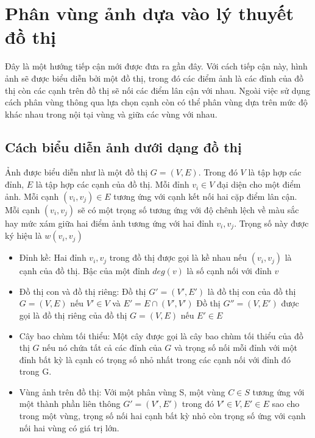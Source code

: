 \documentclass[12pt,oneside,a4]{report}
\begin{document}
\section{Phân vùng ảnh dựa vào lý thuyết đồ thị}
Đây là một hướng tiếp cận mới được đưa ra gần đây. Với cách tiếp cận này, hình ảnh sẽ được biểu diễn bởi một đồ thị, trong đó các điểm ảnh là các đỉnh của đồ thị còn các cạnh trên đồ thị sẽ nối các điểm lân cận với nhau. Ngoài việc sử dụng cách phân vùng thông qua lựa chọn cạnh còn có thể phân vùng dựa trên mức độ khác nhau trong nội tại vùng và giữa các vùng với nhau.
\subsection{Cách biểu diễn ảnh dưới dạng đồ thị}
Ảnh được biểu diễn như là một đồ thị $G=(V,E)$. Trong đó $V$ là tập hợp các đỉnh, $E$ là tập hợp các cạnh của đồ thị. Mỗi đỉnh $v_i\in V$ đại diện cho một điểm ảnh. Mỗi cạnh $(v_i,v_j)\in E$ tương ứng với cạnh kết nối hai cặp điểm lân cận. Mỗi cạnh $(v_i,v_j)$ sẽ có một trọng số tương ứng với độ chênh lệch về màu sắc hay mức xám giữa hai điểm ảnh tương ứng với hai đỉnh $v_i, v_j $. Trọng số này được ký hiệu là $w(v_i, v_j)$
\begin{itemize}
\item Đỉnh kề: Hai đỉnh $v_i, v_j$ trong đồ thị được gọi là kề nhau nếu $(v_i,v_j)$ là cạnh của đồ thị. Bậc của một đỉnh $deg(v)$ là số cạnh nối với đỉnh $v$
\item Đồ thị con và đồ thị riêng:
Đồ thị $G'=(V',E')$ là đồ thị con của đồ thị $G=(V,E)$ nếu $V'\in V$ và $E'=E\cap (V',V')$ 
Đồ thị  $G''=(V,E')$ được gọi là đồ thị riêng của đồ thị $G=(V,E)$ nếu $E'\in E$
\item Cây bao chùm tối thiểu: Một cây được gọi là cây bao chùm tối thiểu của đồ thị $G$  nếu nó chứa tất cả các đỉnh của $G$ và trọng số nối mỗi đỉnh với một đỉnh bất kỳ là cạnh có trọng số nhỏ nhất trong các cạnh nối với đỉnh đó trong G. 
\item Vùng ảnh trên đồ thị: Với một phân vùng S, một vùng $C\in S$ tương ứng với một thành phần liên thông $G'=(V', E')$ trong đó  $V'\in V, E' \in E$ sao cho trong một vùng, trọng số nối hai cạnh bất kỳ nhỏ còn trọng số ứng với cạnh nối hai vùng có giá trị lớn.
\end{itemize}
\end{document}
